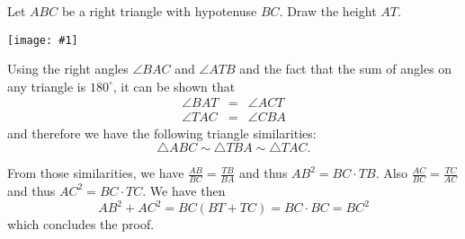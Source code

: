 \documentclass[12pt]{article}
\newcommand{\figura}[1]{\begin{center}\texttt{[image: \#1]}\end{center}}
\begin{document}
Let $ABC$ be a right triangle with hypotenuse $BC$. Draw the height $AT$.
\figura{pythaproof}

Using the right angles $\angle BAC$ and $\angle ATB$ and the fact that the sum of angles on any triangle is $180^\circ$, it can be shown that
\begin{eqnarray*}
\angle BAT &=& \angle ACT\\
\angle TAC &=& \angle CBA
\end{eqnarray*}
and therefore we have the following triangle similarities:
$$\triangle ABC \sim \triangle TBA \sim \triangle TAC.$$

From those similarities, we have
$\frac{AB}{BC}=\frac{TB}{BA}$ and thus $AB^2 = BC\cdot TB$. Also
$\frac{AC}{BC}=\frac{TC}{AC}$ and thus $AC^2= BC \cdot TC$. We have then
$$AB^2 + AC^2 = BC(BT+TC) = BC\cdot BC = BC^2$$
which concludes the proof.
\end{document}
